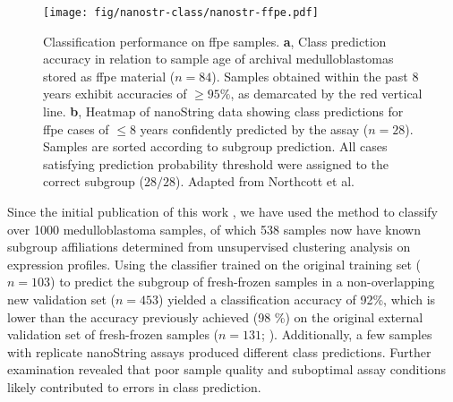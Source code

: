 \begin{figure}[ht]
	\begin{center}
		\texttt{[image: fig/nanostr-class/nanostr-ffpe.pdf]}
	\end{center}
	\caption[Classification performance on formalin-fixed paraffin embedded archival samples]
	{
	Classification performance on \gls{ffpe} samples.
	\textbf{a}, Class prediction accuracy in relation to sample age of archival medulloblastomas stored as \gls{ffpe} material ($n = 84$). Samples obtained within the past 8 years exhibit accuracies of $\geq 95\%$, as demarcated by the red vertical line.
	\textbf{b}, Heatmap of nanoString data showing class predictions for \gls{ffpe} cases of $\leq 8$ years confidently predicted by the assay ($n = 28$). Samples are sorted according to subgroup prediction. All cases satisfying prediction probability threshold were assigned to the correct subgroup ($28/28$). Adapted from Northcott et al.
	}
	\label{fig:nanostr-ffpe}
\end{figure}

Since the initial publication of this work , we have used the method to classify over 1000 medulloblastoma samples, of which 538 samples now have known subgroup affiliations determined from unsupervised clustering analysis on expression profiles. Using the classifier trained on the original training set ($n = 103$) to predict the subgroup of fresh-frozen samples in a non-overlapping new validation set ($n = 453$) yielded a classification accuracy of 92\%, which is lower than the accuracy previously achieved (98 \%) on the original external validation set of fresh-frozen samples ($n = 131$; ). Additionally, a few samples with replicate nanoString assays produced different class predictions. Further examination revealed that poor sample quality and suboptimal assay conditions likely contributed to errors in class prediction.

